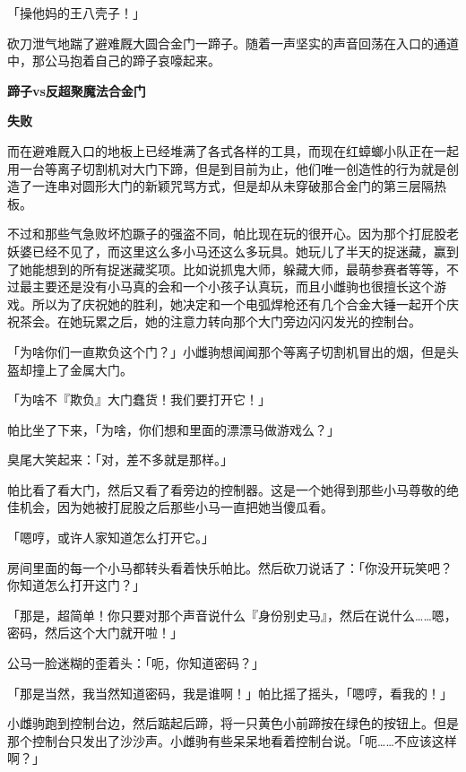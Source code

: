 \horizonline


「操他妈的王八壳子！」

砍刀泄气地踹了避难厩大圆合金门一蹄子。随着一声坚实的声音回荡在入口的通道中，那公马抱着自己的蹄子哀嚎起来。

\begin{center}
    \textbf{蹄子vs反超聚魔法合金门}

    \textbf{失败}
\end{center}

而在避难厩入口的地板上已经堆满了各式各样的工具，而现在红蟑螂小队正在一起用一台等离子切割机对大门下蹄，但是到目前为止，他们唯一创造性的行为就是创造了一连串对圆形大门的新颖咒骂方式，但是却从未穿破那合金门的第三层隔热板。

不过和那些气急败坏尥蹶子的强盗不同，帕比现在玩的很开心。因为那个打屁股老妖婆已经不见了，而这里这么多小马还这么多玩具。她玩儿了半天的捉迷藏，赢到了她能想到的所有捉迷藏奖项。比如说抓鬼大师，躲藏大师，最萌参赛者等等，不过最主要还是没有小马真的会和一个小孩子认真玩，而且小雌驹也很擅长这个游戏。所以为了庆祝她的胜利，她决定和一个电弧焊枪还有几个合金大锤一起开个庆祝茶会。在她玩累之后，她的注意力转向那个大门旁边闪闪发光的控制台。

「为啥你们一直欺负这个门？」小雌驹想闻闻那个等离子切割机冒出的烟，但是头盔却撞上了金属大门。

「为啥不『欺负』大门蠢货！我们要打开它！」

帕比坐了下来，「为啥，你们想和里面的漂漂马做游戏么？」

臭尾大笑起来：「对，差不多就是那样。」

帕比看了看大门，然后又看了看旁边的控制器。这是一个她得到那些小马尊敬的绝佳机会，因为她被打屁股之后那些小马一直把她当傻瓜看。

「嗯哼，或许人家知道怎么打开它。」

房间里面的每一个小马都转头看着快乐帕比。然后砍刀说话了：「你没开玩笑吧？你知道怎么打开这门？」

「那是，超简单！你只要对那个声音说什么『身份别史马』，然后在说什么……嗯，密码，然后这个大门就开啦！」

公马一脸迷糊的歪着头：「呃，你知道密码？」

「那是当然，我当然知道密码，我是谁啊！」帕比摇了摇头，「嗯哼，看我的！」

小雌驹跑到控制台边，然后踮起后蹄，将一只黄色小前蹄按在绿色的按钮上。但是那个控制台只发出了沙沙声。小雌驹有些呆呆地看着控制台说。「呃……不应该这样啊？」

